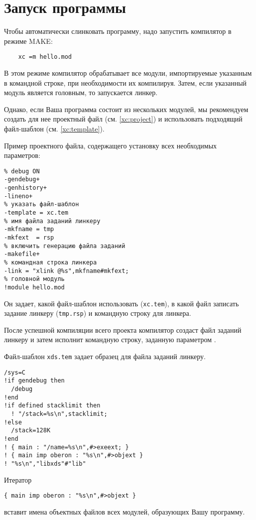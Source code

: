\section{Запуск программы}\label{start:run}

\ifgencode        %

Чтобы автоматически слинковать программу, надо запустить
компилятор в режиме MAKE: %

\verb'    xc =m hello.mod'

В этом режиме компилятор обрабатывает все модули, импортируемые
указанным в командной строке, при необходимости их компилируя.
Затем, если указанный модуль является головным, то запускается линкер.

Однако, если Ваша программа состоит из нескольких модулей, мы рекомендуем
создать для нее проектный файл
(см. \ref{xc:project}) и использовать подходящий файл-шаблон
(см. \ref{xc:template}).

Пример проектного файла, содержащего установку всех необходимых
параметров:
\begin{verbatim}
% debug ON
-gendebug+
-genhistory+
-lineno+
% указать файл-шаблон
-template = xc.tem
% имя файла заданий линкеру
-mkfname = tmp
-mkfext  = rsp
% включить генерацию файла заданий
-makefile+
% командная строка линкера
-link = "xlink @%s",mkfname#mkfext;
% головной модуль
!module hello.mod
\end{verbatim}
Он задает, какой файл-шаблон использовать
({\tt xc.tem}), в какой файл записать задание линкеру
({\tt tmp.rsp}) и командную строку для линкера.

После успешной компиляции всего проекта компилятор создаст файл
заданий линкеру и затем исполнит командную строку, заданную
параметром .

Файл-шаблон {\tt xds.tem} задает образец для файла заданий линкеру.
\ifcomment
\begin{verbatim}
/sys=C
!if gendebug then
  /debug
!end
!if defined stacklimit then
  ! "/stack=%s\n",stacklimit;
!else
  /stack=128K
!end
! { main : "/name=%s\n",#>exeext; }
! { main imp oberon : "%s\n",#>objext }
! "%s\n","libxds"#"lib"
\end{verbatim}

Итератор
\begin{verbatim}
{ main imp oberon : "%s\n",#>objext }
\end{verbatim}
вставит имена объектных файлов всех модулей, образующих Вашу программу.


